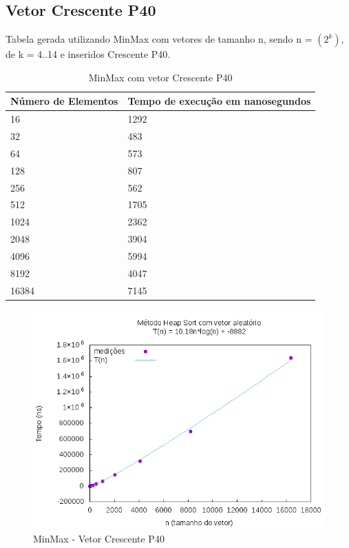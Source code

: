 \documentclass[12pt,a4paper,twoside]{report}
\begin{document}
\subsection{Vetor Crescente P40}
Tabela gerada utilizando MinMax com vetores de tamanho n, sendo n = $(2^k)$, de k = 4..14 e inseridos Crescente P40.
\begin{table}[H]
\centering
\caption{MinMax com vetor Crescente P40}
\label{my-label}
\begin{tabular}{|l|l|}
\hline
\multicolumn{1}{|c|}{\textbf{Número de Elementos}} & \multicolumn{1}{c|}{\textbf{Tempo de execução em nanosegundos}} \\ \hline
16 & 1292 \\ \hline
32 & 483 \\ \hline
64 & 573 \\ \hline
128 & 807 \\ \hline
256 & 562 \\ \hline
512 & 1705 \\ \hline
1024 & 2362 \\ \hline
2048 & 3904 \\ \hline
4096 & 5994 \\ \hline
8192 & 4047 \\ \hline
16384 & 7145 \\ \hline
\end{tabular}
\end{table}

\begin{figure}[H]
    \centering
    \includegraphics[width=0.7\linewidth]{graficos/HeapSort/vIntAleatorio/vIntAleatorio.png}
  \caption{MinMax - Vetor Crescente P40}
\end{figure}
\end{document}
